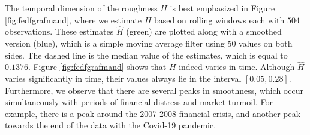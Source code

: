 The temporal dimension of the roughness $H$ is best emphasized in Figure \ref{fig:fedfgrafmand}, where we estimate $H$ based on rolling windows each with $504$ observations. These estimates $\hat{H}$ (green) are plotted along with a smoothed version (blue), which is a simple moving average filter using 50 values on both sides. The dashed line is the median value of the estimates, which is equal to $0.1376$. Figure \ref{fig:fedfgrafmand} shows that $H$ indeed varies in time. Although $\hat{H}$ varies significantly in time, their values always lie in the interval $[0.05, 0.28]$. Furthermore, we observe that there are several peaks in smoothness, which occur simultaneously with periods of financial distress and market turmoil. For example, there is a peak around the 2007-2008 financial crisis, and another peak towards the end of the data with the Covid-19 pandemic. 
